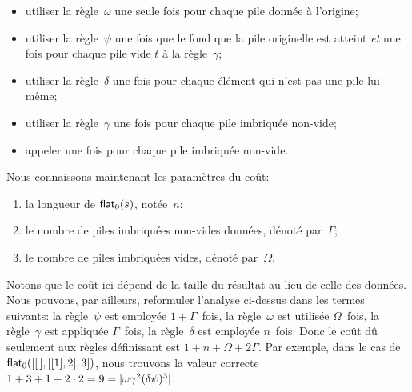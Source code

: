 \begin{itemize}

  \item utiliser la règle~\(\omega\) une seule fois pour chaque pile
    donnée à l'origine;

  \item utiliser la règle~\(\psi\) une fois que le fond que la pile
    originelle est atteint \emph{et} une fois pour chaque pile vide
    \(t\) à la règle~\(\gamma\);

  \item utiliser la règle~\(\delta\) une fois pour chaque élément qui
    n'est pas une pile lui-même;

  \item utiliser la règle~\(\gamma\) une fois pour chaque pile
    imbriquée non-vide;

  \item appeler  une fois pour
    chaque pile imbriquée non-vide.

\end{itemize}
Nous connaissons maintenant les paramètres du coût:
\begin{enumerate}

  \item la longueur de
    \(\textsf{flat}_0(s)\), notée~\(n\);

  \item le nombre de piles imbriquées non-vides données, dénoté
    par~\(\Gamma\);

  \item le nombre de piles imbriquées vides, dénoté par~\(\Omega\).

\end{enumerate}
Notons que le coût ici dépend de la taille du résultat au lieu de
celle des données. Nous pouvons, par ailleurs, reformuler l'analyse
ci-dessus dans les termes suivants: la règle~\(\psi\) est employée \(1
+ \Gamma\)~fois, la règle~\(\omega\) est utilisée \(\Omega\)~fois, la
règle~\(\gamma\) est appliquée \(\Gamma\)~fois, la règle~\(\delta\)
est employée \(n\)~fois. Donc le coût dû seulement aux règles
définissant  est \(1 +
n + \Omega + 2\Gamma\). Par exemple, dans le cas de
\(\textsf{flat}_0([[\,],[[1],2],3])\), nous trouvons la valeur correcte
\(1 + 3 + 1 + 2 \cdot 2 = 9 = \lvert{\omega\gamma^2(\delta\psi)^3}\rvert{}\).

